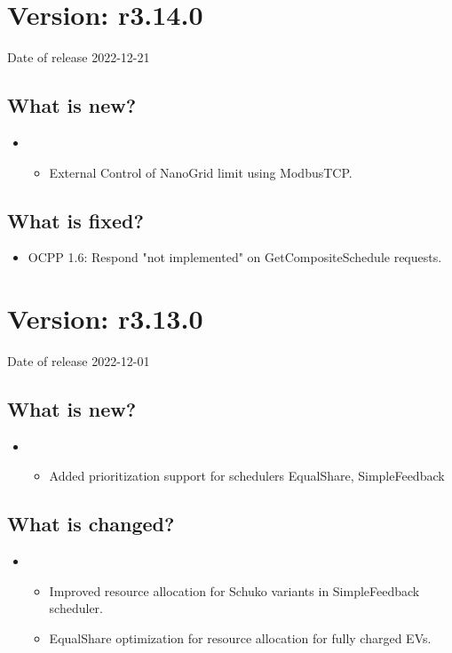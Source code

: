 \documentclass{scrartcl}
\begin{document}
\section{Version: r3.14.0}
Date of release 2022-12-21
\subsection*{What is new?}
\begin{itemize}
  \item \nanogrid\
  \begin{itemize}
  \item External Control of NanoGrid limit using ModbusTCP.
  \end{itemize}
\end{itemize}
\subsection*{What is fixed?}
\begin{itemize}
\item OCPP 1.6: Respond "not implemented" on GetCompositeSchedule requests.
\end{itemize}

\section{Version: r3.13.0}
Date of release 2022-12-01
\subsection*{What is new?}
\begin{itemize}
\item \nanogrid\
    \begin{itemize}
    \item Added prioritization support for schedulers EqualShare,
    SimpleFeedback
    \end{itemize}
\end{itemize}
\subsection*{What is changed?}
\begin{itemize}
\item \nanogrid\
    \begin{itemize}
    \item Improved resource allocation for Schuko variants in SimpleFeedback scheduler.
    \item EqualShare optimization for resource allocation for fully charged EVs.
    \end{itemize}
\end{itemize}
\end{document}
